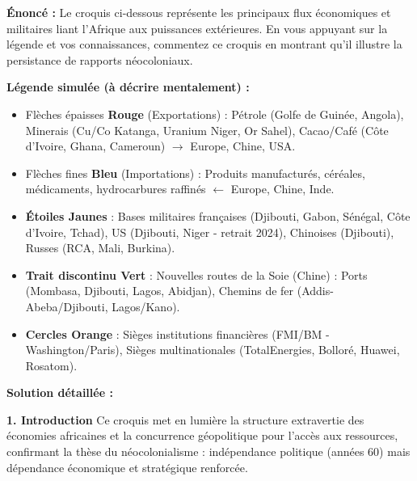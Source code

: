 \documentclass[11pt]{article}
\newcommand{\cle}[1]{{\popxbold\color{popdark}#1}}
\begin{document}
\begin{exoresolu}
\textbf{Énoncé :} Le croquis ci-dessous représente les principaux flux économiques et militaires liant l'Afrique aux puissances extérieures. En vous appuyant sur la légende et vos connaissances, commentez ce croquis en montrant qu'il illustre la persistance de rapports néocoloniaux.

\textbf{Légende simulée (à décrire mentalement) :}
\begin{itemize}
    \item Flèches épaisses \textbf{Rouge} (Exportations) : Pétrole (Golfe de Guinée, Angola), Minerais (Cu/Co Katanga, Uranium Niger, Or Sahel), Cacao/Café (Côte d'Ivoire, Ghana, Cameroun) $\to$ Europe, Chine, USA.
    \item Flèches fines \textbf{Bleu} (Importations) : Produits manufacturés, céréales, médicaments, hydrocarbures raffinés $\leftarrow$ Europe, Chine, Inde.
    \item \textbf{Étoiles Jaunes} : Bases militaires françaises (Djibouti, Gabon, Sénégal, Côte d'Ivoire, Tchad), US (Djibouti, Niger - retrait 2024), Chinoises (Djibouti), Russes (RCA, Mali, Burkina).
    \item \textbf{Trait discontinu Vert} : Nouvelles routes de la Soie (Chine) : Ports (Mombasa, Djibouti, Lagos, Abidjan), Chemins de fer (Addis-Abeba/Djibouti, Lagos/Kano).
    \item \textbf{Cercles Orange} : Sièges institutions financières (FMI/BM - Washington/Paris), Sièges multinationales (TotalEnergies, Bolloré, Huawei, Rosatom).
\end{itemize}

\tcblower
\textbf{Solution détaillée :}

\textbf{1. Introduction}
Ce croquis met en lumière la \cle{structure extravertie} des économies africaines et la \cle{concurrence géopolitique} pour l'accès aux ressources, confirmant la thèse du néocolonialisme : indépendance politique (années 60) mais dépendance économique et stratégique renforcée.


\end{exoresolu}
\end{document}
